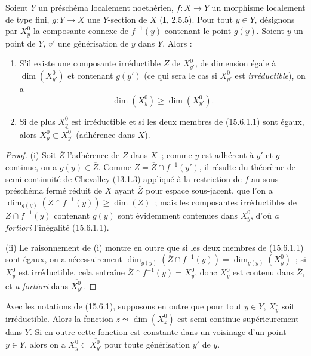 \begin{proposition}[15.6.1]
\label{IV.15.6.1-fr}
Soient $Y$ un préschéma localement noethérien, $f:X\to Y$ un morphisme localement de type fini, $g:Y\to X$ une $Y$-section de $X$ \textup{(\textbf{I}, 2.5.5)}. Pour tout $y\in Y$, désignons par $X_y^0$ la composante connexe de $f^{-1}(y)$ contenant le point $g(y)$. Soient $y$ un point de $Y$, $v'$ une générisation de $y$ dans $Y$. Alors :
\begin{enumerate}[label=\emph{(\roman*)}]
  \item S'il existe une composante irréductible $Z$ de $X_{y'}^0$, de dimension égale à $\dim(X_{y'}^0)$ et contenant $g(y')$ \textup{(ce qui sera le cas si $X_{y'}^0$ est \emph{irréductible})}, on a
\begin{equation}
\tag{15.6.1.1}
\label{IV.15.6.1.1-fr}
  \dim(X_y^0)\geqslant\dim(X_{y'}^0).
\end{equation}
  \item Si de plus $X_y^0$ est irréductible et si les deux membres de \textup{(15.6.1.1)} sont égaux, alors $X_y^0\subset\overline{X_{y'}^0}$ (adhérence dans $X$).
\end{enumerate}
\end{proposition}

\begin{proof}
(i) Soit $\overline Z$ l'adhérence de $Z$ dans $X$~; comme $y$ est adhérent à $y'$ et $g$ continue, on a $g(y)\in\overline Z$. Comme $Z=\overline Z\cap f^{-1}(y')$, il résulte du théorème de semi-continuité de Chevalley (13.1.3) appliqué à la restriction de $f$ au sous-préschéma fermé réduit de $X$ ayant $\overline Z$ pour espace sous-jacent, que l'on a
$\dim_{g(y)}(\overline Z\cap f^{-1}(y))\geqslant\dim(Z)$~;
mais les composantes irréductibles de $\overline Z\cap f^{-1}(y)$ contenant $g(y)$ sont évidemment contenues dans $X_y^0$, d'où \emph{a fortiori} l'inégalité (15.6.1.1).

(ii) Le raisonnement de (i) montre en outre que si les deux membres de (15.6.1.1) sont égaux, on a nécessairement
$\dim_{g(y)}(\overline Z\cap f^{-1}(y))=\dim_{g(y)}(X_y^0)$~;
si $X_y^0$ est irréductible, cela entraîne $\overline Z\cap f^{-1}(y)=X_y^0$, donc $X_y^0$ est contenu dans $\overline Z$, et \emph{a fortiori} dans $\overline{X_{y'}^0}$.
\end{proof}

\begin{corollary}[15.6.2]
Avec les notations de \textup{(15.6.1)}, supposons en outre que pour tout $y\in Y$, $X_y^0$ soit irréductible. Alors la fonction $z\leadsto\dim(X_z^0)$ est semi-continue supérieurement dans $Y$. Si en outre cette fonction est constante dans un voisinage d'un point $y\in Y$, alors on a $X_y^0\subset\overline{X_{y'}^0}$ pour toute générisation $y'$ de $y$.
\end{corollary}

